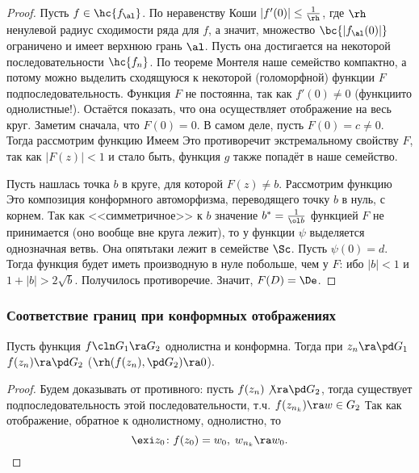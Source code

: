 \documentclass[a4paper]{article}
\begin{document}
\begin{theorem}
\begin{proof}
Пусть $f \in \hc{f_\al}$. По неравенству Коши $|f'(0)| \le \frac{1}{\rh}$, где $\rh$\т ненулевой радиус
сходимости ряда для $f$, а значит, множество $\bc{|f_\al(0)|}$ ограничено и имеет верхнюю грань $\al$.
Пусть она достигается на некоторой последовательности $\hc{f_n}$. По теореме Монтеля наше семейство компактно,
а потому можно выделить сходящуюся к некоторой (голоморфной) функции $F$ подпоследовательность. Функция $F$ не постоянна,
так как $f'(0)\neq 0$ (функции\д то однолистные!). Остаётся показать, что она осуществляет отображение на весь круг.
Заметим сначала, что $F(0)=0$. В самом деле, пусть $F(0)=c\neq 0$. Тогда рассмотрим функцию
Имеем
Это противоречит экстремальному свойству $F$, так как $|F(z)|< 1$ и стало быть, функция $g$ также попадёт
в наше семейство.

Пусть нашлась точка $b$ в круге, для которой $F(z)\neq b$. Рассмотрим функцию
Это композиция конформного автоморфизма, переводящего точку $b$ в нуль, с корнем. Так как <<симметричное>> к $b$
значение $b^* = \frac{1}{\ol b}$ функцией $F$ не принимается (оно вообще вне круга лежит), то у функции $\psi$
выделяется однозначная ветвь. Она опять\д таки лежит в семействе $\Sc$. Пусть $\psi(0) = d$. Тогда
функция
будет иметь производную в нуле побольше, чем у $F$:
ибо $|b|<1$ и $1+|b|>2\sqrt b$. Получилось противоречие. Значит, $F(D) = \De$.
\end{proof}

\subsubsection{Соответствие границ при конформных отображениях}

\begin{theorem}
Пусть функция $f\cln G_1 \ra G_2$ однолистна и конформна. Тогда при
$z_n \ra \pd G_1$  $f(z_n)\ra \pd G_2$ ($\rh (f(z_n), \pd G_2)\ra 0$).
\end{theorem}

\begin{proof}
Будем доказывать от противного: пусть $f(z_n)\not\ra \pd G_2$, тогда существует
подпоследовательность этой последовательности, т.ч. $f(z_{n_k})\ra w\in G_2$
Так как отображение, обратное к однолистному, однолистно,  то
$$\exi z_0\colon f(z_0)=w_0,  \; w_{n_k}\ra w_0.$$


\end{proof}
\end{theorem}
\end{document}
